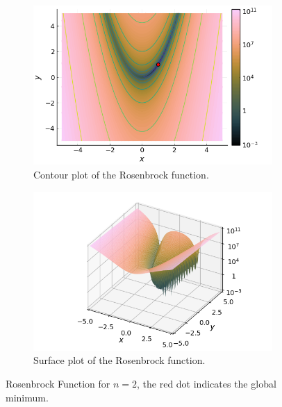   \begin{figure}[ht!]
    \centering
    \begin{subfigure}[b]{0.45\textwidth}
      \centering
      \includegraphics[width=\textwidth]{img/test_functions/rosenbrock_contour.png}
      \caption{Contour plot of the Rosenbrock function.}
      \label{fig:rosenbrock_contour}
    \end{subfigure}
    \hfill
    \begin{subfigure}[b]{0.45\textwidth}
      \centering
      \includegraphics[width=\textwidth]{img/test_functions/rosenbrock_surface.png}
      \caption{Surface plot of the Rosenbrock function.}
      \label{fig:rosenbrock_surface}
    \end{subfigure}
    \caption{
      Rosenbrock Function for \(n = 2\), the red dot indicates the global
      minimum.
    }
    \label{fig:rosenbrock_function}
  \end{figure}

